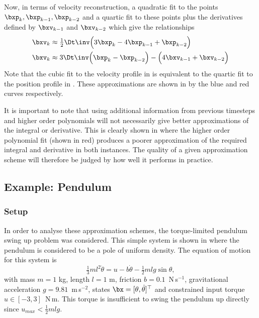 Now, in terms of velocity reconstruction, a quadratic fit to the points $\bxp_k, \bxp_{k-1}, \bxp_{k-2}$ and a quartic fit to these points plus the derivatives defined by $\bxv_{k-1}$ and $\bxv_{k-2}$ which give the relationships
\begin{align}
\bxv_{k} &\approx \tfrac{1}{2} \Dt\inv \Big( 3\bxp_{k} - 4\bxp_{k-1} + \bxp_{k-2} \Big) \label{eqn:dada2} \\
\bxv_{k} &\approx 3\Dt\inv \Big( \bxp_k - \bxp_{k-2} \Big) - \Big( 4\bxv_{k-1} + \bxv_{k-2} \Big) \label{eqn:mama2}
\end{align}
Note that the cubic fit to the velocity profile in  is equivalent to the quartic fit to the position profile in . These approximations are shown in  by the blue and red curves respectively.

It is important to note that using additional information from previous timesteps and higher order polynomials will not necessarily give better approximations of the integral or derivative. This is clearly shown in  where the higher order polynomial fit (shown in red) produces a poorer approximation of the required integral and derivative in both instances. The quality of a given approximation scheme will therefore be judged by how well it performs in practice.


\subsection{Example: Pendulum} \label{sec:pendulum}

\subsubsection{Setup}
In order to analyse these approximation schemes, the torque-limited pendulum swing up problem was considered. This simple system is shown in  where the pendulum is considered to be a pole of uniform density. The equation of motion for this system is
\begin{equation}
\tfrac{1}{3}ml^2 \ddot{\theta} = u - b\dot\theta - \tfrac{1}{2}mlg\sin\theta,
\end{equation}
with mass $m=1\!$ kg, length $l=1\!$ m, friction $b = 0.1\!$~N$\,$s$^{-1}$, gravitational acceleration $g=9.81\!$~m$\,$s$^{-2}$, states $\bx = [\theta, \dot\theta]^\top$ and constrained input torque $u\in [-3,3]\!$~N$\,$m. This torque is insufficient to swing the pendulum up directly since $u_{max} < \tfrac{1}{2}mlg$.

